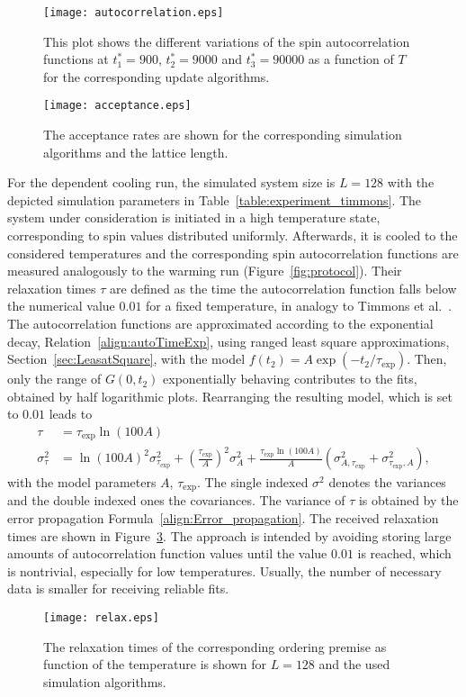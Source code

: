 \begin{figure}[!h]
  \texttt{[image: autocorrelation.eps]}
  \caption{This plot shows the different variations of the spin autocorrelation functions at $t_1^*\!=\!900$, 
           $t_2^*\!=\!9000$ and $t_3^*\!=\!90000$ as a function of $T$ for the corresponding update algorithms.}
  \label{fig:auto}
\end{figure}

\begin{figure}[!h]
  \texttt{[image: acceptance.eps]}
  \caption{The acceptance rates are shown for the corresponding simulation algorithms and the lattice length.}
  \label{fig:prop}
\end{figure}
 
For the dependent cooling run, the simulated system size is $L\!=\!128$ with the depicted simulation parameters in Table~\ref{table:experiment_timmons}. The system under consideration
is initiated in a high temperature state, corresponding to spin values distributed uniformly. Afterwards, it is cooled to the considered temperatures and the 
corresponding spin autocorrelation functions are measured analogously to the warming run (Figure~\ref{fig:protocol}). Their relaxation times $\tau$ are defined as the time the autocorrelation 
function falls below the numerical value $0.01$ for a fixed temperature, in analogy to Timmons et al.~\cite{Timmons2018}. The autocorrelation functions are approximated 
according to the exponential decay, Relation~\eqref{align:autoTimeExp}, using ranged least square approximations, Section~\ref{sec:LeasatSquare}, with the 
model $f(t_2)\!=\!A\exp(-t_2/\tau_\mathrm{exp})$. Then, only the range of $G(0,t_2)$ exponentially behaving contributes to the fits, obtained by half logarithmic plots. 
Rearranging the resulting model, which is set to $0.01$ leads to 
\begin{align*}
    \tau          &= \tau_\mathrm{exp}\ln(100A) \\
    \sigma^2_\tau &= \ln(100A)^2\sigma_{\tau_\mathrm{exp}}^2+\left(\frac{\tau_\mathrm{exp}}{A}\right)^2\sigma_A^2
                                                            +\frac{\tau_\mathrm{exp}\ln(100A)}{A}(\sigma^2_{A,\tau_\mathrm{exp}}+\sigma^2_{\tau_\mathrm{exp},A}),
\end{align*}
with the model parameters $A$, $\tau_\mathrm{exp}$. The single indexed $\sigma^2$ denotes the variances and the double indexed ones the covariances. 
The variance of $\tau$ is obtained by the error propagation Formula~\eqref{align:Error_propagation}. The received relaxation times are shown in Figure~\ref{fig:relax}.
The approach is intended by avoiding storing large amounts of autocorrelation function values until the value $0.01$ is reached, which is nontrivial, especially 
for low temperatures. Usually, the number of necessary data is smaller for receiving reliable fits.

\begin{figure}[!h]
  \texttt{[image: relax.eps]}
  \caption{The relaxation times of the corresponding ordering premise as function of the temperature is shown for $L\!=\!128$ and the used simulation
           algorithms.}
  \label{fig:relax}
\end{figure}

\newpage




